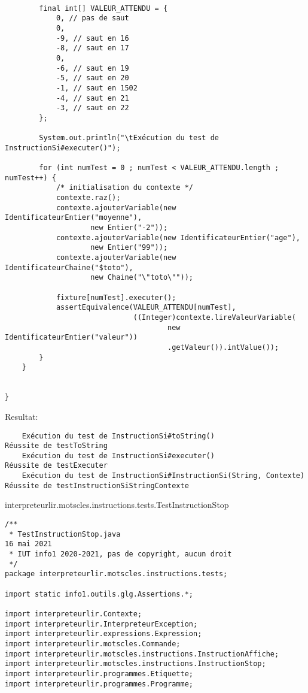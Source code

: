 \begin{enum}
\begin{verbatim}
        
        final int[] VALEUR_ATTENDU = {
            0, // pas de saut
            0,
            -9, // saut en 16
            -8, // saut en 17
            0,
            -6, // saut en 19
            -5, // saut en 20
            -1, // saut en 1502
            -4, // saut en 21
            -3, // saut en 22
        };
        
        System.out.println("\tExécution du test de InstructionSi#executer()");
        
        for (int numTest = 0 ; numTest < VALEUR_ATTENDU.length ; numTest++) {
            /* initialisation du contexte */
            contexte.raz();
            contexte.ajouterVariable(new IdentificateurEntier("moyenne"), 
                    new Entier("-2"));
            contexte.ajouterVariable(new IdentificateurEntier("age"), 
                    new Entier("99"));
            contexte.ajouterVariable(new IdentificateurChaine("$toto"), 
                    new Chaine("\"toto\""));
            
            fixture[numTest].executer();
            assertEquivalence(VALEUR_ATTENDU[numTest], 
                              ((Integer)contexte.lireValeurVariable(
                                      new IdentificateurEntier("valeur"))
                                      .getValeur()).intValue());
        } 
    }
    

}
\end{verbatim}
Resultat:
\begin{verbatim}
    Exécution du test de InstructionSi#toString()
Réussite de testToString
    Exécution du test de InstructionSi#executer()
Réussite de testExecuter
    Exécution du test de InstructionSi#InstructionSi(String, Contexte)
Réussite de testInstructionSiStringContexte
\end{verbatim}

    \item interpreteurlir.motscles.instructions.tests.TestInstructionStop
\begin{verbatim}
/**
 * TestInstructionStop.java                                             16 mai 2021
 * IUT info1 2020-2021, pas de copyright, aucun droit
 */
package interpreteurlir.motscles.instructions.tests;

import static info1.outils.glg.Assertions.*;

import interpreteurlir.Contexte;
import interpreteurlir.InterpreteurException;
import interpreteurlir.expressions.Expression;
import interpreteurlir.motscles.Commande;
import interpreteurlir.motscles.instructions.InstructionAffiche;
import interpreteurlir.motscles.instructions.InstructionStop;
import interpreteurlir.programmes.Etiquette;
import interpreteurlir.programmes.Programme;


\end{verbatim}
\end{enum}
